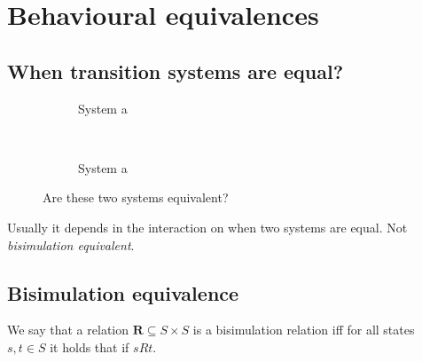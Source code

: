 
\section{Behavioural equivalences}

\subsection{When transition systems are equal?}

\begin{figure}[H]
  \centering
  \begin{subfigure}[b]{.4\textwidth}
    \centering
    \caption{System a \label{fig:02_system_a}}
  \end{subfigure}
  ~
  \begin{subfigure}[b]{.4\textwidth}
    \centering
    \caption{System a \label{fig:02_system_b}}
  \end{subfigure}
  \caption{Are these two systems equivalent?}
\end{figure}



Usually it depends in the interaction on when two systems are equal. 
Not \emph{bisimulation equivalent}.


\subsection{Bisimulation equivalence}

We say that a relation \( \pmb{R} \subseteq S \times S \) is a bisimulation relation iff for all states
\( s,t \in S \) it holds that if \( sRt \).

